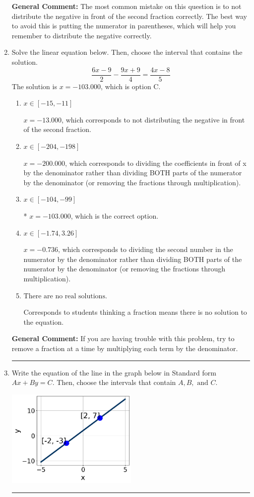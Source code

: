 \documentclass{extbook}[14pt]
\newcommand{\litem}[1]{\item #1

\rule{\textwidth}{0.4pt}}
\begin{document}
\begin{enumerate}
{\textbf{General Comment:} The most common mistake on this question is to not distribute the negative in front of the second fraction correctly. The best way to avoid this is putting the numerator in parentheses, which will help you remember to distribute the negative correctly.
}
\litem{
Solve the linear equation below. Then, choose the interval that contains the solution.
\[ \frac{6x -9}{2} - \frac{9x + 9}{4} = \frac{4x -8}{5} \]The solution is \( x = -103.000 \), which is option C.\begin{enumerate}[label=\Alph*.]
\item \( x \in [-15, -11] \)

 $x = -13.000$, which corresponds to not distributing the negative in front of the second fraction.
\item \( x \in [-204, -198] \)

 $x = -200.000$, which corresponds to dividing the coefficients in front of x by the denominator rather than dividing BOTH parts of the numerator by the denominator (or removing the fractions through multiplication).
\item \( x \in [-104, -99] \)

* $x = -103.000$, which is the correct option.
\item \( x \in [-1.74, 3.26] \)

 $x = -0.736$, which corresponds to dividing the second number in the numerator by the denominator rather than dividing BOTH parts of the numerator by the denominator (or removing the fractions through multiplication).
\item \( \text{There are no real solutions.} \)

Corresponds to students thinking a fraction means there is no solution to the equation.
\end{enumerate}

\textbf{General Comment:} If you are having trouble with this problem, try to remove a fraction at a time by multiplying each term by the denominator.
}
\litem{
Write the equation of the line in the graph below in Standard form $Ax+By=C$. Then, choose the intervals that contain $A, B, \text{ and } C$.

\begin{center}
    \includegraphics[width=0.5\textwidth]{../Figures/linearGraphToStandardCopyC.png}
\end{center}


}
\end{enumerate}
\end{document}
